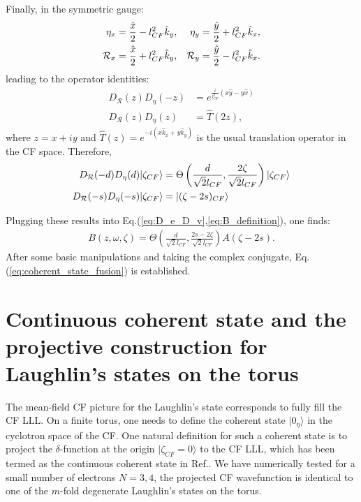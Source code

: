 \begin{subappendices}
    Finally, in the symmetric gauge:
    \begin{align}
        \eta_x       & =\frac{\hat x}{2}-l^2_{CF} \hat k_y, & \eta_y       & =\frac{\hat y}{2}+l^2_{CF} \hat k_x,\notag \\
        \mathcal R_x & =\frac{\hat x}{2}+l^2_{CF} \hat k_y, & \mathcal R_y & =\frac{\hat y}{2}-l^2_{CF} \hat k_x.\notag \\
    \end{align}
    leading to the operator identities:
    \begin{align}
        D_{\mathcal R}(z) D_{\eta}(-z) & =e^{\frac{i}{l_{CF}^2}(x\hat y-y\hat x)}\label{eq:op id: D_R(z)D_eta(-z)=exp(...)} \\
        D_{\mathcal R}(z) D_{\eta}(z)  & =\hat T(2z),\label{eq:op id: D_R(z)D_eta(-z)=T(2z)}
    \end{align}
    where $z=x+iy$ and $\hat T(z)=e^{-i(x \hat k_x+y\hat k_y)}$ is the usual translation operator in the CF space. Therefore,
    \begin{align}
        D_{\mathcal R}(-d)D_{\eta}(d)|\zeta_{CF}\rangle  & =\Theta\left(\frac{d}{\sqrt{2}l_{CF}},\frac{2\zeta}{\sqrt{2}l_{CF}}\right)|\zeta_{CF}\rangle\notag \\
        D_{\mathcal R}(-s)D_{\eta}(-s)|\zeta_{CF}\rangle & =|(\zeta-2s)_{CF}\rangle
    \end{align}

    Plugging these results into Eq.(\ref{eq:D_e_D_v},\ref{eq:B_definition}), one finds:
    \begin{align}
        B(z,\omega,\zeta)=\Theta\left(\frac{d}{\sqrt{2}l_{CF}},\frac{2s-2\zeta}{\sqrt{2}l_{CF}}\right)A(\zeta-2s).
    \end{align}
    After some basic manipulations and taking the complex conjugate, Eq.(\ref{eq:coherent_state_fusion}) is established.


    \section{Continuous coherent state and the projective construction for Laughlin's states on the torus}\label{app:ccs}
    The mean-field CF picture for the Laughlin's state corresponds to fully fill the CF LLL. On a finite torus, one needs to define the coherent state $|0_{\eta}\rangle$ in the cyclotron space of the CF. One natural definition for such a coherent state is to project the $\delta$-function at the origin $|\zeta_{CF}=0\rangle$ to the CF LLL, which has been termed as the continuous coherent state in Ref.\cite{fremling2014coherent}. We have numerically tested for a small number of electrons $N=3,4$, the projected CF wavefunction is identical to one of the $m$-fold degenerate Laughlin's states on the torus.


\end{subappendices}
